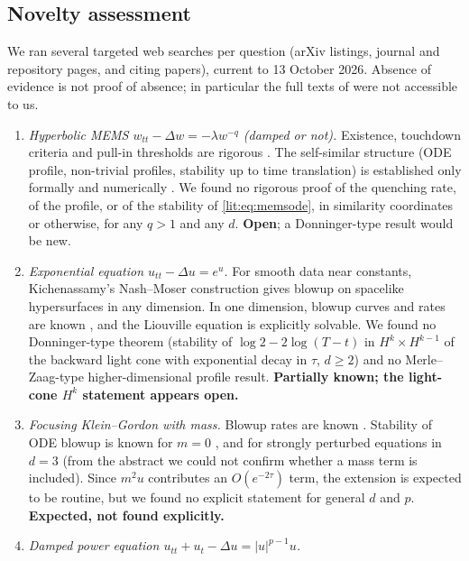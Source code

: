 \subsection{Novelty assessment}
\label{lit:novelty}
We ran several targeted web searches per question (arXiv listings, journal
and repository pages, and citing papers), current to 13 October 2026.
Absence of evidence is not proof of absence; in particular the full texts
of \cite{KavallarisEtAl2015,Guo2010,Kichenassamy1996} were not accessible to
us.
\begin{enumerate}[leftmargin=1.4em,itemsep=2pt]
\item \emph{Hyperbolic MEMS $w_{tt}-\Delta w=-\lambda w^{-q}$ (damped or
not).} Existence, touchdown criteria and pull-in thresholds are rigorous
\cite{ChangLevine1981,FloresEtAl2007,Guo2010,KavallarisEtAl2011,Flores2014,KavallarisEtAl2015,Miyasita2017}.
The self-similar structure (ODE profile, non-trivial profiles, stability up
to time translation) is established only formally and numerically
\cite{GimperleinHeLacey2022,He2021}. We found no rigorous proof of the
quenching rate, of the profile, or of the stability of
\eqref{lit:eq:memsode}, in similarity coordinates or otherwise, for any
$q>1$ and any $d$. \textbf{Open}; a Donninger-type result would be new.
\item \emph{Exponential equation $u_{tt}-\Delta u=e^u$.} For smooth data
near constants, Kichenassamy's Nash--Moser construction \cite{Kichenassamy1996}
gives blowup on spacelike hypersurfaces in any dimension. In one dimension,
blowup curves and rates are known \cite{Godin2000,AzaiezMasmoudiZaag2016},
and the Liouville equation is explicitly solvable. We found no
Donninger-type theorem (stability of
$\log2-2\log(T-t)$ in $H^k\times H^{k-1}$ of the backward light cone with
exponential decay in $\tau$, $d\ge2$) and no Merle--Zaag-type higher-dimensional
profile result. \textbf{Partially known; the light-cone $H^k$ statement
appears open.}
\item \emph{Focusing Klein--Gordon with mass.} Blowup rates are known
\cite{KillipStovallVisan2014,HamzaZaag2013}. Stability of ODE blowup is
known for $m=0$ \cite{Ostermann2024}, and for strongly perturbed equations
in $d=3$ \cite{DonningerWallauch2021} (from the abstract we could not
confirm whether a mass term is included). Since $m^2u$ contributes an
$O(e^{-2\tau})$ term, the extension is expected to be routine, but we found
no explicit statement for general $d$ and $p$. \textbf{Expected, not found
explicitly.}
\item \emph{Damped power equation $u_{tt}+u_t-\Delta u=|u|^{p-1}u$.}

\end{enumerate}
